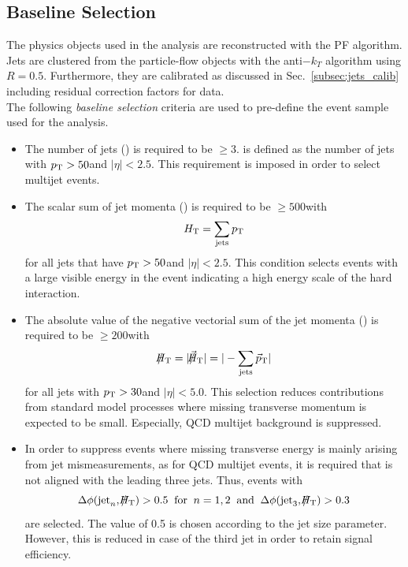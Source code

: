 \subsection{Baseline Selection}
\label{subsec:RA2_baseline}
The physics objects used in the analysis are reconstructed with the PF algorithm. Jets are clustered from the particle-flow objects with the anti$-k_T$ algorithm using $R = 0.5$. Furthermore, they are calibrated as discussed in Sec.~\ref{subsec:jets_calib} including residual correction factors for data. \\
The following \textit{baseline selection} criteria are used to pre-define the event sample used for the analysis.
\begin{itemize}
 \item{The number of jets (\NJets) is required to be $\ge 3$. \NJets is defined as the number of jets with $p_{\text{T}} > 50$\gev and $|\eta| < 2.5$. This requirement is imposed in order to select multijet events.}
 \item{The scalar sum of jet momenta (\HT) is required to be $\ge 500$\gev with 
\begin{equation*}
H_{\text{T}} = \sum_{\mathrm{jets}} p_{\text{T}} 
\end{equation*}
for all jets that have $p_{\text{T}} > 50$\gev and $|\eta| < 2.5$. This condition selects events with a large visible energy in the event indicating a high energy scale of the hard interaction.}   
 \item{The absolute value of the negative vectorial sum of the jet momenta (\MHT) is required to be $\ge 200$\gev with
\begin{equation*}
\slash\mkern-12mu{H}_{\text{T}} = |\slash\mkern-12mu{\vec{H}}_{\text{T}}|= |- \sum_{\mathrm{jets}} \vec{p}_{\text{T}}|
\end{equation*}
for all jets with $p_{\text{T}} > 30$\gev and $|\eta| < 5.0$. This selection reduces contributions from standard model processes where missing transverse momentum is expected to be small. Especially, QCD multijet background is suppressed. } 
 \item{In order to suppress events where missing transverse energy is mainly arising from jet mismeasurements, as for QCD multijet events, it is required that \MHT is not aligned with the leading three jets. Thus, events with
\begin{equation*}
\Delta \phi(\mathrm{jet}_n, \slash\mkern-12mu{H}_{\text{T}}) > 0.5 \;\; \mathrm{for} \;\; n = 1,2 \;\; \mathrm{and} \;\; \Delta \phi(\mathrm{jet}_3, \slash\mkern-12mu{H}_{\text{T}}) > 0.3
\end{equation*} 
are selected. The value of 0.5 is chosen according to the jet size parameter. However, this is reduced in case of the third jet in order to retain signal efficiency. }

\end{itemize}
